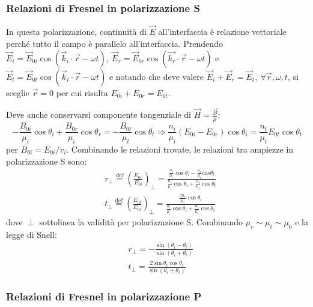 \documentclass[10pt, a4paper]{scrartcl}
\numberwithin{equation}{subsection}
\theoremstyle{style1}
\begin{document}
\subsubsection{Relazioni di Fresnel in polarizzazione S}
In questa polarizzazione, continuit\`a di $\vec{E}$ all'interfaccia \`e relazione vettoriale perch\'e tutto il campo \`e parallelo all'interfaccia. Prendendo $\vec{E}_i = \vec{E}_{0i} \cos(\vec{k}_i \cdot \vec{r}-\omega t),\ \vec{E}_r = \vec{E}_{0r} \cos(\vec{k_r} \cdot \vec{r}-\omega t) $ e $\vec{E}_t = \vec{E}_{0t} \cos(\vec{k}_t \cdot \vec{r}-\omega t) $ e notando che deve valere $\vec{E}_i +\vec{E}_r = \vec{E}_t, \ \forall \vec{r}, \omega, t$, si sceglie $\vec{r}=0$ per cui risulta $E_{0i} + E_{0r} = E_{0t}  $.

Deve anche conservarsi componente tangenziale di $\vec{H}= \frac{\vec{B}}{\mu }$:
\[
- \frac{B_{0 i} }{\mu _i} \cos \theta _i + \frac{B_{0r} }{\mu _i}\cos \theta _r = - \frac{B_{0t} }{\mu _t}\cos \theta _t\Rightarrow \frac{n_i}{\mu _i} (E_{0i} - E_{0r} ) \cos \theta _i = \frac{n_t}{\mu _t} E_{0t} \cos \theta _t 
\] 
per $B_{0i} = E_{0i} / v_i$. Combinando le relazioni trovate, le relazioni tra ampiezze in polarizzazione S sono:
\begin{equation}
	\begin{split}
		&r_\perp \overset{\text{def}}{=} \left(\frac{E_{0r} }{E_{0i} }\right)_\perp = \frac{\frac{n_i}{\mu _i}\cos \theta _i - \frac{n_t}{\mu _t}cos \theta _t}{\frac{n_i}{\mu _i}\cos \theta _i + \frac{n_t}{\mu _t}\cos \theta _t}\\
		&t_\perp \overset{\text{def}}{=}\left(\frac{E_{0t} }{E_{0i} }\right) _\perp = \frac{ \frac{2n_i}{\mu _i}\cos \theta _i}{\frac{n_i}{\mu _i}\cos \theta _i + \frac{n_t}{\mu _t}\cos \theta _t}
	\end{split}
\end{equation}
dove $\perp$ sottolinea la validit\`a per polarizzazione S. Combinando $\mu _r \sim \mu _t \sim \mu _0$ e la legge di Snell:
\begin{equation}
	\begin{split}
		&r_\perp = - \frac{\sin(\theta _i - \theta _t)}{\sin(\theta _i + \theta _t)}\\
		&t_\perp = \frac{2 \sin \theta _t \cos \theta _i}{\sin (\theta _i + \theta _t)}
	\end{split}
\end{equation}
\subsubsection{Relazioni di Fresnel in polarizzazione P}
\end{document}
